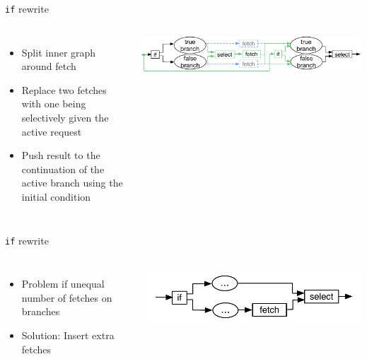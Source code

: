 \documentclass[utf8x,10pt,aspectratio=169]{beamer}
\begin{document}
\begin{frame}{\texttt{if} rewrite}
	\begin{columns}
		\begin{itemize}
			\item Split inner graph around fetch
			\item Replace two fetches with one being selectively given the active request
			\item<2-> Push result to the continuation of the active branch using the initial condition
		\end{itemize}
		\includegraphics[width=\textwidth]{graphs/basic-if-rewrite}
	\end{columns}
\end{frame}

\addtocounter{framenumber}{-1}

\begin{frame}{\texttt{if} rewrite}
	\begin{columns}
		\column{0.4\textwidth}
		\begin{itemize}[<+->]
			\item Problem if unequal number of fetches on branches
			\item Solution: Insert extra fetches
		\end{itemize}
		\column{0.6\textwidth}
		\includegraphics[width=\textwidth]{graphs/insert-empty-fetches}
	\end{columns}
\end{frame}
%
\addtocounter{framenumber}{-1}
\end{document}
